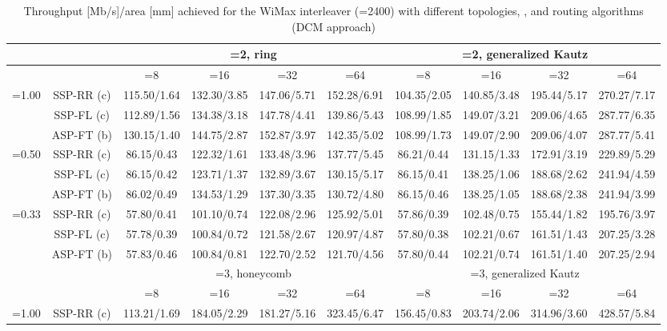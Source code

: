 \documentclass[10pt,twocolumn,journal]{IEEEtran}
\begin{document}
\begin{table*}[t!]
  \centering
  \caption{Throughput [Mb/s]/area [mm] achieved for the WiMax interleaver (=2400) with different topologies, 
,  and routing algorithms (DCM approach)} \label{tab:wimax_results}
   { \scriptsize
  \begin{tabular}{|c|c|c|c|c|c|c|c|c|c|}
\hline
& 	 & \multicolumn{4}{c|}{=2, ring} & \multicolumn{4}{c|}{=2, generalized Kautz} \\
\hline
& 	 & =8 & =16 & =32 & =64 & =8 & =16 & =32 & =64 \\
\hline
\multirow{3}{*}{=1.00} & SSP-RR (c) & 115.50/1.64 & 132.30/3.85 & 147.06/5.71 & 152.28/6.91 & 104.35/2.05 & 140.85/3.48 & 195.44/5.17 & 270.27/7.17 \\
& SSP-FL (c) & 112.89/1.56 & 134.38/3.18 & 147.78/4.41 & 139.86/5.43 & 108.99/1.85 & 149.07/3.21 & 209.06/4.65 & 287.77/6.35 \\
& ASP-FT (b) & 130.15/1.40 & 144.75/2.87 & 152.87/3.97 & 142.35/5.02 & 108.99/1.73 & 149.07/2.90 & 209.06/4.07 & 287.77/5.41 \\
\hline
\multirow{3}{*}{=0.50} & SSP-RR (c) & 86.15/0.43 & 122.32/1.61 & 133.48/3.96 & 137.77/5.45 & 86.21/0.44 & 131.15/1.33 & 172.91/3.19 & 229.89/5.29 \\
& SSP-FL (c) & 86.15/0.42 & 123.71/1.37 & 132.89/3.67 & 130.15/5.17 & 86.15/0.41 & 138.25/1.06 & 188.68/2.62 & 241.94/4.59 \\
& ASP-FT (b) & 86.02/0.49 & 134.53/1.29 & 137.30/3.35 & 130.72/4.80 & 86.15/0.46 & 138.25/1.05 & 188.68/2.38 & 241.94/3.99 \\
\hline
\multirow{3}{*}{=0.33} & SSP-RR (c) & 57.80/0.41 & 101.10/0.74 & 122.08/2.96 & 125.92/5.01 & 57.86/0.39 & 102.48/0.75 & 155.44/1.82 & 195.76/3.97 \\
& SSP-FL (c) & 57.78/0.39 & 100.84/0.72 & 121.58/2.67 & 120.97/4.87 & 57.80/0.38 & 102.21/0.67 & 161.51/1.43 & 207.25/3.28 \\
& ASP-FT (b) & 57.83/0.46 & 100.84/0.81 & 122.70/2.52 & 121.70/4.56 & 57.80/0.44 & 102.21/0.74 & 161.51/1.40 & 207.25/2.94 \\
\hline
\hline
& 	 & \multicolumn{4}{c|}{=3, honeycomb} & \multicolumn{4}{c|}{=3, generalized Kautz} \\
\hline
& 	 & =8 & =16 & =32 & =64 & =8 & =16 & =32 & =64 \\
\hline
\multirow{3}{*}{=1.00} & SSP-RR (c) & 113.21/1.69 & 184.05/2.29 & 181.27/5.16 & 323.45/6.47 & 156.45/0.83 & 203.74/2.06 & 314.96/3.60 & 428.57/5.84 \\

\end{tabular}}
\end{table*}
\end{document}
